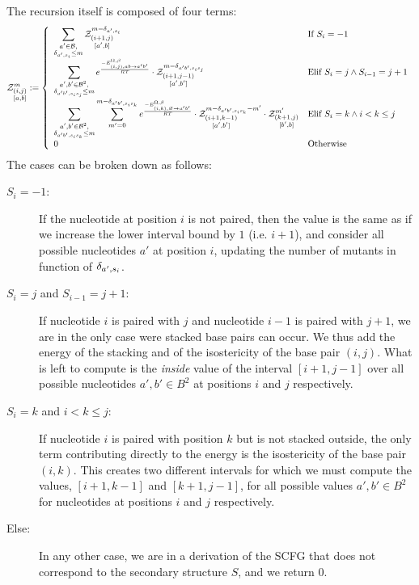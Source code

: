 The recursion itself is composed of four terms:
\begin{equation}
	\Z{i,j}{m}{a,b}:=\left\{
  \begin{array}{ll}
  		\displaystyle
      \sum_{\substack{a'\in \B,\\ \Kron_{a',s_i}\le m}}  
      \Z{i+1,j}{m-\Kron_{a',s_i}}{a',b} & \text{If }S_{i}=-1\\
      \displaystyle
      \sum_{\substack{a',b'\in \B^2,\\ \Kron_{a'b',s_is_j}\le m}}
			 e^{\frac{-E_{(i,j),ab \to a'b'}^{\Omega,\beta}}{RT}}
			 \cdot \Z{i+1,j-1}{m-\Kron_{a'b',s_is_j}}{a',b'}&
			 \text{Elif }S_i=j \land S_{i-1}=j+1\\
			 \displaystyle
      \sum_{\substack{a',b'\in \B^2,\\ \Kron_{a'b',s_is_k}\le m}}
      \sum_{m'=0}^{m-\Kron_{a'b',s_is_k}}
   		 e^{\frac{-E_{(i,k),\varnothing\to a'b'}^{\Omega,\beta}}{RT}}
      \cdot\Z{i+1,k-1}{m-\Kron_{a'b',s_is_k}-m'}{a',b'}
      \cdot\Z{k+1,j}{m'}{b',b} & \text{Elif }S_i=k \land i < k \leq j\\
      0 &\text{Otherwise}
	\end{array}\right.
\label{eq:Z_rec}
\end{equation}
The cases can be broken down as follows:
\begin{description}
\item[$S_{i}=-1$:] If the nucleotide at position $i$ is not paired, then the value is the same
as if we increase the lower interval bound by $1$ (i.e. $i+1$), and consider all possible
 nucleotides $a'$ at position $i$, updating the number of mutants in function of $\delta_{a',s_i}$. 
\item[$S_i=j$ and $S_{i-1}=j+1$:] If nucleotide $i$ is paired with $j$ and nucleotide $i-1$ is
paired with $j+1$, we are in the only case were stacked base pairs can occur. We thus add
the energy of the stacking and of the isostericity of the base pair $(i,j)$. What is left
to compute is the \emph{inside} value of the interval $[i+1,j-1]$ over all possible nucleotides 
$a',b'\in B^2$ at positions $i$ and $j$ respectively.
\item[$S_i=k$ and $i<k \leq j$:] If nucleotide $i$ is paired with position $k$ 
but is not stacked outside, the 
only term contributing directly to the energy is the isostericity of the base pair $(i,k)$. This 
creates
two different intervals for which we must compute the values, $[i+1,k-1]$ and $[k+1,j-1]$, for 
all possible values $a',b'\in B^2$ for nucleotides at positions $i$ and $j$ respectively.
\item[Else:] In any other case, we are in a derivation of the SCFG that does not correspond to the 
secondary structure $S$, and we return $0$.
\end{description}

